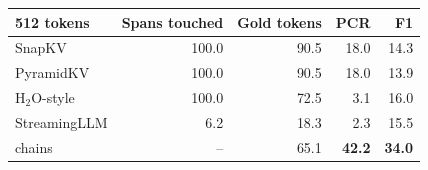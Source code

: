 \begin{tabular}{@{}lrrrr@{}}
\toprule
512 tokens & Spans touched & Gold tokens & PCR & F1 \\
\midrule
SnapKV & 100.0 & 90.5 & 18.0 & 14.3 \\
PyramidKV & 100.0 & 90.5 & 18.0 & 13.9 \\
H$_2$O-style & 100.0 & 72.5 & 3.1 & 16.0 \\
StreamingLLM & 6.2 & 18.3 & 2.3 & 15.5 \\
\midrule
\proofkv{} chains & -- & 65.1 & \textbf{42.2} & \textbf{34.0} \\
\bottomrule
\end{tabular}
